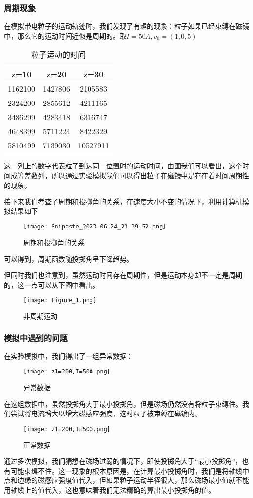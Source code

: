 \documentclass{ctexart}
\begin{document}
\subsubsection{周期现象}
在模拟带电粒子的运动轨迹时，我们发现了有趣的现象：粒子如果已经束缚在磁镜中，那么它的运动时间近似是周期的。取$I=50A,v_0=(1,0,5)$
\begin{table}[h]
    \centering
    \caption{粒子运动的时间}
    \begin{tabular}{|c|c|c|}
        \hline
        z=10 & z=20 & z=30 \\
        \hline
        1162100 & 1427806 & 2105583 \\
        \hline
        2324200 & 2855612 & 4211165 \\
        \hline
        3486299 & 4283418 & 6316747 \\
        \hline
        4648399 & 5711224 & 8422329 \\
        \hline
        5810499 & 7139030 & 10527911 \\
        \hline
    \end{tabular}
\end{table}
这一列上的数字代表粒子到达同一位置时的运动时间，由图我们可以看出，这个时间成等差数列，所以通过实验模拟我们可以得出粒子在磁镜中是存在着时间周期性的现象。
\par
接下来我们考查了周期和投掷角的关系，在速度大小不变的情况下，利用计算机模拟结果如下
\begin{figure}[h]
    \centering
    \texttt{[image: Snipaste\_2023-06-24\_23-39-52.png]}
    \caption{周期和投掷角的关系}
\end{figure}
\par
可以得到，周期函数随投掷角呈下降趋势。\par
但同时我们也注意到，虽然运动时间存在周期性，但是运动本身却不一定是周期的，这一点可以从下图中看出。
\begin{figure}[h]
    \centering
    \texttt{[image: Figure\_1.png]}
    \caption{非周期运动}
\end{figure}
\subsubsection{模拟中遇到的问题}
在实验模拟中，我们得出了一组异常数据：\par
\begin{figure}[h]
    \centering
    \texttt{[image: z1=200,I=50A.png]}
    \caption{异常数据}
\end{figure}
在这组数据中，虽然投掷角大于最小投掷角，但是磁场仍然没有将粒子束缚住。我们尝试将电流增大以增大磁感应强度，这时粒子被束缚在磁镜内。\par 
\begin{figure}[h]
    \centering
    \texttt{[image: z1=200,I=500.png]}
    \caption{正常数据}
\end{figure}
通过多次模拟，我们猜想在磁场过弱的情况下，即使投掷角大于“最小投掷角”，也有可能束缚不住。这一现象的根本原因是，在计算最小投掷角时，我们是将轴线中点和边缘的磁感应强度值代入，但如果粒子运动半径很大，那么磁场最小值就不能用轴线上的值代入，这也意味着我们无法精确的算出最小投掷角的值。
\end{document}
